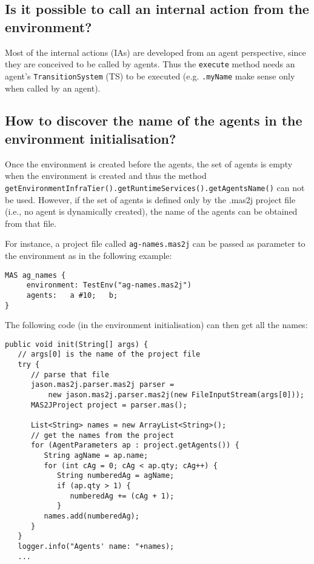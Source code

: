 \documentclass{article}
\newcommand{\code}[1]{\texttt{#1}}
\begin{document}
\subsection{Is it possible to call an internal action from the
environment?}

Most of the internal actions (IAs) are developed from an agent
perspective, since they are conceived to be called by agents. Thus the
\code{execute} method needs an agent's
\code{TransitionSystem} (TS) to be executed (e.g. \code{.myName} make
sense only when called by an agent).


\subsection{How to discover the name of the agents in the environment initialisation?}

Once the environment is created before the agents, the set of agents
is empty when the environment is created and thus the method
\texttt{getEnvironmentInfraTier().getRuntimeServices().getAgentsName()}
can not be used. However, if the set of agents is defined only by the
.mas2j project file (i.e., no agent is dynamically created), the name
of the agents can be obtained from that file.

For instance, a project file called \texttt{ag-names.mas2j} can be
passed as parameter to the environment as in the following example:

\begin{verbatim}
MAS ag_names {
     environment: TestEnv("ag-names.mas2j")
     agents:   a #10;   b;
}
\end{verbatim}

The following code (in the environment initialisation) can then get
all the names:

\begin{verbatim}
public void init(String[] args) {
   // args[0] is the name of the project file
   try {
      // parse that file
      jason.mas2j.parser.mas2j parser =
          new jason.mas2j.parser.mas2j(new FileInputStream(args[0]));
      MAS2JProject project = parser.mas();
			
      List<String> names = new ArrayList<String>();
      // get the names from the project
      for (AgentParameters ap : project.getAgents()) {
         String agName = ap.name;
         for (int cAg = 0; cAg < ap.qty; cAg++) {
            String numberedAg = agName;
            if (ap.qty > 1) {
               numberedAg += (cAg + 1);
            }
         names.add(numberedAg);
      }
   }
   logger.info("Agents' name: "+names);
   ...
\end{verbatim}
\end{document}
